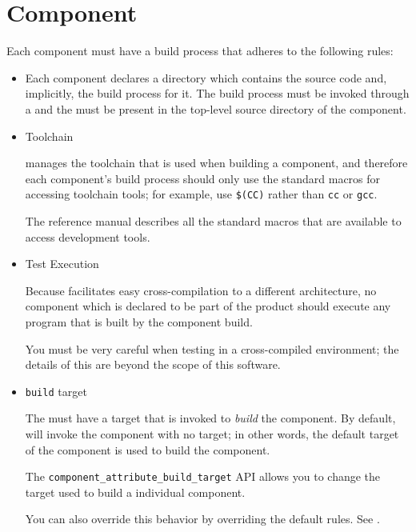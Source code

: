\section{Component \makefile}\label{wrap:component-makefile}

Each component must have a build process that adheres to the following
rules:

\begin{itemize}
\item \makefile

  Each component declares a directory which contains the source code
  and, implicitly, the build process for it.  The build process must
  be invoked through a \makefile and the \makefile must be present in
  the top-level source directory of the component.

\item Toolchain

  \lmsbw manages the toolchain that is used when building a component,
  and therefore each component's build process should only use the
  standard macros for accessing toolchain tools; for example, use
  \texttt{\$(CC)} rather than \texttt{cc} or \texttt{gcc}.

  The \gnumake reference manual describes all the standard macros that
  are available to access development tools.

\item Test Execution

  Because \lmsbw facilitates easy cross-compilation to a different
  architecture, no component which is declared to be part of the
  product should execute any
  program that is built by the component build.

  You must be very careful when testing in a cross-compiled
  environment; the details of this are beyond the scope of this
  software.

\item \texttt{build} target

  The \makefile must have a target that is invoked to \emph{build} the
  component.  By default, \lmsbw will invoke the component \makefile
  with no target; in other words, the default target of the component
  \makefile is used to build the component.

  The \texttt{component\_attribute\_build\_target} API allows you to
  change the target used to build a individual component.

  You can also override this behavior by overriding the default
  rules.  See .


\end{itemize}
